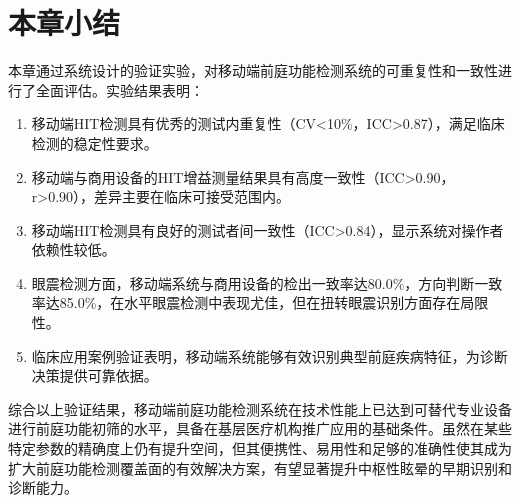 \section{本章小结}

本章通过系统设计的验证实验，对移动端前庭功能检测系统的可重复性和一致性进行了全面评估。实验结果表明：

\begin{enumerate}
  \item 移动端HIT检测具有优秀的测试内重复性（CV<10\%，ICC>0.87），满足临床检测的稳定性要求。

  \item 移动端与商用设备的HIT增益测量结果具有高度一致性（ICC>0.90，r>0.90），差异主要在临床可接受范围内。

  \item 移动端HIT检测具有良好的测试者间一致性（ICC>0.84），显示系统对操作者依赖性较低。

  \item 眼震检测方面，移动端系统与商用设备的检出一致率达80.0\%，方向判断一致率达85.0\%，在水平眼震检测中表现尤佳，但在扭转眼震识别方面存在局限性。

  \item 临床应用案例验证表明，移动端系统能够有效识别典型前庭疾病特征，为诊断决策提供可靠依据。
\end{enumerate}

综合以上验证结果，移动端前庭功能检测系统在技术性能上已达到可替代专业设备进行前庭功能初筛的水平，具备在基层医疗机构推广应用的基础条件。虽然在某些特定参数的精确度上仍有提升空间，但其便携性、易用性和足够的准确性使其成为扩大前庭功能检测覆盖面的有效解决方案，有望显著提升中枢性眩晕的早期识别和诊断能力。
